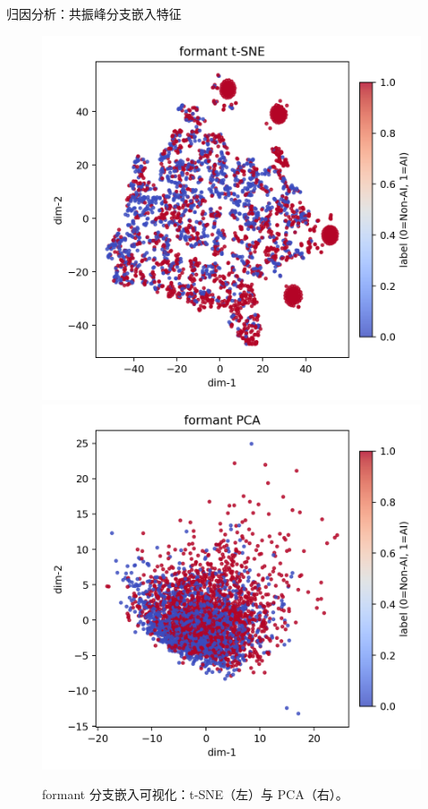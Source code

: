 \documentclass[aspectratio=169]{beamer}
\begin{document}
%
%

\begin{frame}{归因分析：共振峰分支嵌入特征}
\begin{figure}
  \centering
  \includegraphics[width=0.45\linewidth]{images_in_paper/embed_formant_tsne.png}
  \hfill
  \includegraphics[width=0.45\linewidth]{images_in_paper/embed_formant_pca.png}
  \caption{formant 分支嵌入可视化：t-SNE（左）与 PCA（右）。}
  \label{fig:formant_embed}
\end{figure}

\end{frame}
\end{document}
